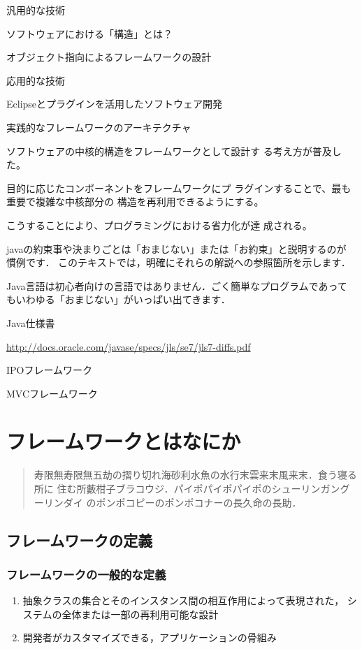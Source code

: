 \documentclass[a4j,papersize]{jsbook}
\begin{document}
汎用的な技術 

ソフトウェアにおける「構造」とは？ 

オブジェクト指向によるフレームワークの設計 

応用的な技術 

Eclipseとプラグインを活用したソフトウェア開発 

実践的なフレームワークのアーキテクチャ 

ソフトウェアの中核的構造をフレームワークとして設計す
る考え方が普及した。 

目的に応じたコンポーネントをフレームワークにプ
ラグインすることで、最も重要で複雑な中核部分の
構造を再利用できるようにする。 

こうすることにより、プログラミングにおける省力化が達
成される。


javaの約束事や決まりごとは「おまじない」または「お約束」と説明するのが
慣例です．
このテキストでは，明確にそれらの解説への参照箇所を示します．

Java言語は初心者向けの言語ではありません．ごく簡単なプログラムであって
もいわゆる「おまじない」がいっぱい出てきます．

Java仕様書

\url{http://docs.oracle.com/javase/specs/jls/se7/jls7-diffs.pdf}

IPOフレームワーク

MVCフレームワーク

\chapter{フレームワークとはなにか}

\begin{abstract}
寿限無寿限無五劫の摺り切れ海砂利水魚の水行末雲来末風来末．食う寝る所に
住む所藪柑子ブラコウジ．パイポパイポパイポのシューリンガングーリンダイ
のポンポコピーのポンポコナーの長久命の長助．
\end{abstract}

\section{フレームワークの定義}
\subsection{フレームワークの一般的な定義 }

\begin{enumerate}
 \item 抽象クラスの集合とそのインスタンス間の相互作用によって表現された，
システムの全体または一部の再利用可能な設計
 \item 開発者がカスタマイズできる，アプリケーションの骨組み
\end{enumerate}
\end{document}
